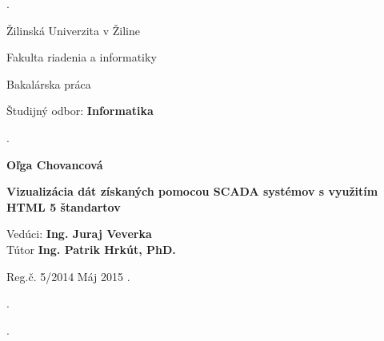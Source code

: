 \hypersetup{pageanchor=false} 

\begin{titlepage}
\phantom.

\bigskip

\begin{center}
{\sc\LARGE Žilinská Univerzita v Žiline}
\medskip

{\sc\Large Fakulta riadenia a informatiky}

\vfill\vfill\vfill\vfill

{\sc\LARGE Bakalárska práca}

\medskip

{\large Študijný odbor: {\bf Informatika}}
\end{center}


\vfill\vfill\vfill\vfill


\phantom.\hfill
\begin{minipage}{10cm}
\begin{center}
{\large\bf Oľga Chovancová}

\medskip

{\large\bf Vizualizácia dát získaných pomocou SCADA systémov s využitím HTML 5 štandartov}

\medskip

Vedúci: {\bf Ing. Juraj Veverka}\\
Tútor	\textbf{Ing. Patrik Hrkút, PhD.}
\medskip
 
\hfill
Reg.č. 5/2014
\hfill
Máj 2015
\hfill\phantom.
\end{center}
\end{minipage}
\hspace{1.7cm}\phantom.

\vspace{2.9cm}

\phantom.
\end{titlepage}




